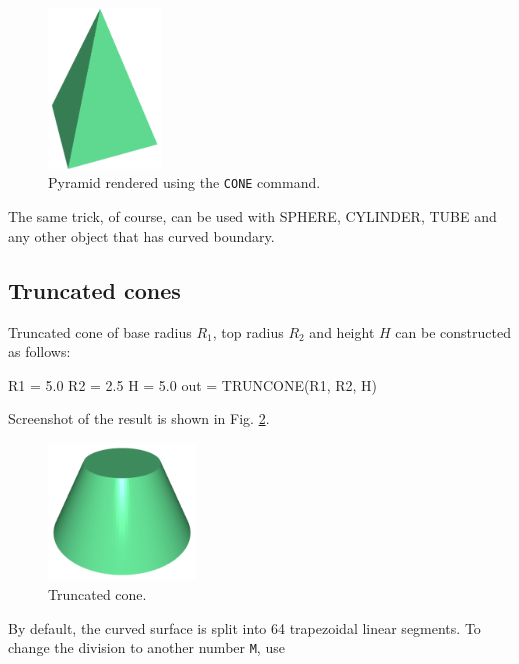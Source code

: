 \begin{figure}[!ht]
\begin{center}
\includegraphics[width=0.27\textwidth]{img/cone-4.png}
\end{center}
\vspace{-4mm}
\caption{Pyramid rendered using the {\tt CONE} command.}
\label{fig:cone-4}
\vspace{-1cm}
\end{figure}
\newpage
\noindent
The same trick, of course, can be used with SPHERE, CYLINDER, TUBE and any 
other object that has curved boundary.

\subsection{Truncated cones}

Truncated cone of base radius $R_1$, top radius $R_2$ and height $H$
can be constructed as follows:

\begin{bluecode}
R1 = 5.0
R2 = 2.5
H = 5.0
out = TRUNCONE(R1, R2, H)
\end{bluecode}
Screenshot of the result is shown in Fig. \ref{fig:tcone}.

\begin{figure}[!ht]
\begin{center}
\includegraphics[width=0.35\textwidth]{img/tcone-8.png}
\end{center}
\vspace{-6mm}
\caption{Truncated cone.}
\label{fig:tcone}
\end{figure}
\noindent
By default, the curved surface is split into 64 trapezoidal linear segments. 
To change the division to another number {\tt M}, use

